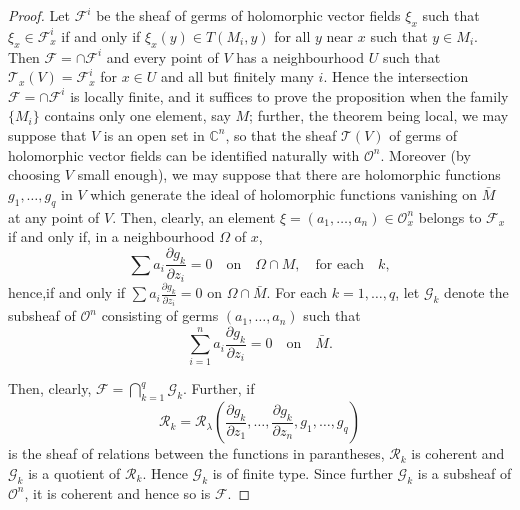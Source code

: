 \begin{proof}
Let $\mathscr{F}^{i}$ be the sheaf of germs of holomorphic vector
fields $\xi_{x}$ such that $\xi_{x}\in\mathscr{F}^{i}_{x}$ if and only
if $\xi_{x}(y)\in T(M_{i},y)$ for all $y$ near $x$ such that $y\in
M_{i}$. Then $\mathscr{F}=\cap\mathscr{F}^{i}$ and every point of $V$
has a neighbourhood $U$ such that
$\mathscr{T}_{x}(V)=\mathscr{F}^{i}_{x}$ for $x\in U$ and all but
finitely many $i$. Hence the intersection $\mathscr{F}=\cap
\mathscr{F}^{i}$ is locally finite, and it suffices to prove the
proposition when the family $\{M_{i}\}$ contains only one element, say
$M$; further, the theorem being local, we may suppose that $V$ is an
open set in $\mathbb{C}^{n}$, so that the sheaf $\mathscr{T}(V)$ of
germs of holomorphic vector fields can be identified naturally with
$\mathscr{O}^{n}$. Moreover (by choosing $V$ small enough), we may
suppose that there are holomorphic functions $g_{1},\ldots,g_{q}$ in
$V$ which generate the ideal of holomorphic functions vanishing on
$\bar{M}$ at any point of $V$. Then, clearly, an element
$\xi=(a_{1},\ldots,a_{n})\in\mathscr{O}^{n}_{x}$ belongs to
$\mathscr{F}_{x}$ if and only if, in a neighbourhood $\Omega$ of $x$,
$$
\sum a_{i}\frac{\partial g_{k}}{\partial z_{i}}=0\quad\text{on}\quad
\Omega \cap M,\quad\text{for each}\quad k,
$$
hence,\pageoriginale if and only if $\sum a_{i}\frac{\partial
  g_{k}}{\partial z_{i}}=0$ on $\Omega\cap \bar{M}$. For each
$k=1,\ldots,q$, let $\mathscr{G}_{k}$ denote the subsheaf of
$\mathscr{O}^{n}$ consisting of germs $(a_{1},\ldots,a_{n})$ such that
$$
\sum^{n}_{i=1}a_{i}\frac{\partial g_{k}}{\partial
  z_{i}}=0\quad\text{on}\quad \bar{M}. 
$$

Then, clearly,
$\mathscr{F}=\bigcap^{q}_{k=1}\mathscr{G}_{k}$. Further, if
$$
\mathscr{R}_{k}=\mathscr{R}_{\lambda}(\dfrac{\partial g_{k}}{\partial
  z_{1}},\ldots, \dfrac{\partial g_{k}}{\partial
  z_{n}},g_{1},\ldots,g_{q})
$$ 
is the sheaf of relations between the
functions in parantheses, $\mathscr{R}_{k}$ is coherent and
$\mathscr{G}_{k}$ is a quotient of $\mathscr{R}_{k}$. Hence
$\mathscr{G}_{k}$ is of finite type. Since further $\mathscr{G}_{k}$
is a subsheaf of $\mathscr{O}^{n}$, it is coherent and hence so is
$\mathscr{F}$. 
\end{proof}

\newpage



